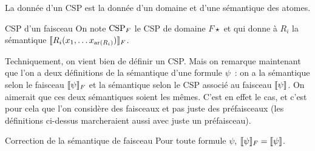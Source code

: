 La donnée d'un CSP est la donnée d'un domaine et d'une sémantique des atomes.

\begin{defi}{CSP d'un faisceau}
    On note $\text{CSP}_F$ le CSP de domaine $F\star$ et qui donne à
    $R_i$ la sémantique $\llbracket {R_i(x_1, \dots x_{\text{ar}(R_i)})} \rrbracket_F$.
\end{defi}

Techniquement, on vient bien de définir un CSP. Mais on remarque maintenant que l'on a
deux définitions de la sémantique d'une formule $\psi$~: on a la sémantique selon le
faisceau $\llbracket {\psi} \rrbracket_F$ et la sémantique selon le CSP associé au faisceau $\llbracket {\psi} \rrbracket$.
On aimerait que ces deux sémantiques soient les mêmes. C'est en effet le cas, et c'est pour
cela que l'on considère des faisceaux et pas juste des préfaisceaux (les définitions
ci-dessus marcheraient aussi avec juste un préfaisceau).

\begin{theo}{Correction de la sémantique de faisceau}\label{shSemCorrect}
    Pour toute formule $\psi$, $\llbracket {\psi} \rrbracket_F = \llbracket {\psi} \rrbracket$.
\end{theo}

